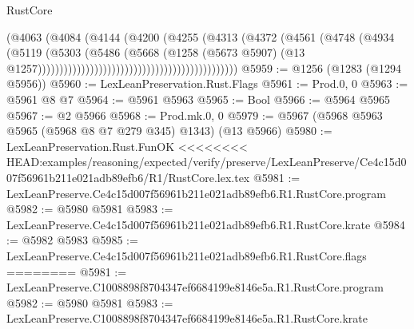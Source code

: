\begin{lexlean}{RustCore}
\begin{coremodule}
{\begin{coremodule}
{{{{{{{{{{{{{{{{{{{{{{{{{{{{{{{{{{{{{{{{{{{{{{{                                                                (@4063
                                                                  (@4084
                                                                    (@4144
                                                                      (@4200
                                                                        (@4255
                                                                          (@4313
                                                                            (@4372
                                                                              (@4561
                                                                                (@4748
                                                                                  (@4934
                                                                                    (@5119
                                                                                      (@5303
                                                                                        (@5486
                                                                                          (@5668
                                                                                            (@1258
                                                                                              (@5673
                                                                                                @5907)
                                                                                              (@13
                                                                                                @1257))))))))))))))))))))))))))))))))))))))))))))))
@5959 := @1256 (@1283 (@1294 @5956))
@5960 := LexLeanPreservation.Rust.Flags
@5961 := Prod.{0, 0}
@5963 := @5961 @8 @7
@5964 := @5961 @5963
@5965 := Bool
@5966 := @5964 @5965
@5967 := @2 @5966
@5968 := Prod.mk.{0, 0}
@5979 := @5967 (@5968 @5963 @5965 (@5968 @8 @7 @279 @345) @1343) (@13 @5966)
@5980 := LexLeanPreservation.Rust.FunOK
<<<<<<<< HEAD:examples/reasoning/expected/verify/preserve/LexLeanPreserve/Ce4c15d007f56961b211e021adb89efb6/R1/RustCore.lex.tex
@5981 := LexLeanPreserve.Ce4c15d007f56961b211e021adb89efb6.R1.RustCore.program
@5982 := @5980 @5981
@5983 := LexLeanPreserve.Ce4c15d007f56961b211e021adb89efb6.R1.RustCore.krate
@5984 := @5982 @5983
@5985 := LexLeanPreserve.Ce4c15d007f56961b211e021adb89efb6.R1.RustCore.flags
========
@5981 := LexLeanPreserve.C1008898f8704347ef6684199e8146e5a.R1.RustCore.program
@5982 := @5980 @5981
@5983 := LexLeanPreserve.C1008898f8704347ef6684199e8146e5a.R1.RustCore.krate
}}}}}}}}}}}}}}}}}}}}}}}}}}}}}}}}}}}}}}}}}}}}}}}
\end{coremodule}}
\end{coremodule}
\end{lexlean}
